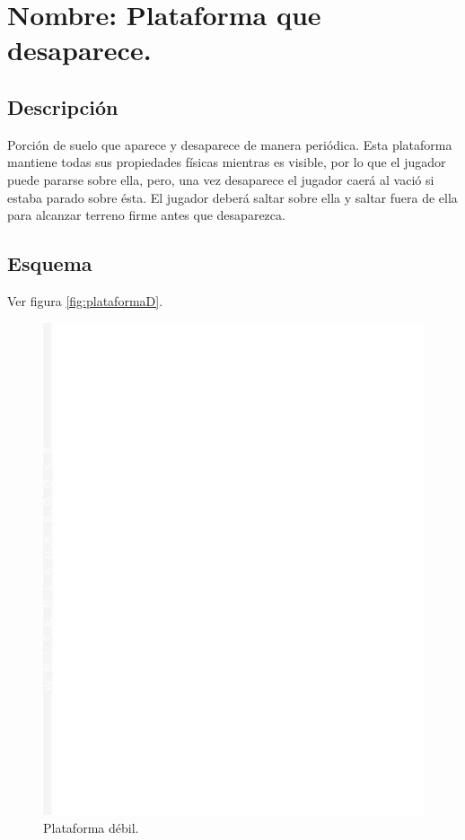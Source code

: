 \section{Nombre: Plataforma que desaparece.}\label{obs.PlatDes}
	\subsection{Descripción}
Porción de suelo que aparece y desaparece de manera periódica. Esta plataforma mantiene todas sus propiedades físicas mientras es visible, por lo que el jugador puede pararse sobre ella, pero, una vez desaparece el jugador caerá al vació si estaba parado sobre ésta. El jugador deberá saltar sobre ella y saltar fuera de ella para alcanzar terreno firme antes que desaparezca.  
	\subsection{Esquema}
	Ver figura \ref{fig:plataformaD}.
	\begin{figure}
		\centering
		\includegraphics[height=0.2 \textheight]{Imagenes/plataformaD}
		\caption{Plataforma débil.}
		\label{fig:plafarmaD}
	\end{figure}